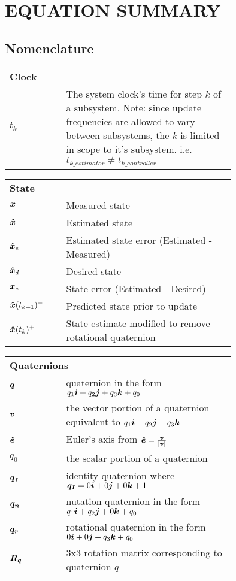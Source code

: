\chapter{EQUATION SUMMARY}
\label{chap:EquationSummary}

\section{Nomenclature}

\begin{nomenclature}
\begin{tabular}{lp{0.75\linewidth}}
  \multicolumn{2}{l}{\textbf{Clock}} \\
  $t_k$ & The system clock's time for step $k$ of a subsystem.  Note: since update frequencies are allowed to vary between subsystems, the $k$ is limited in scope to it's subsystem.  i.e. $t_{k\_estimator} \ne t_{k\_controller}$ \\
\end{tabular}

\begin{tabular}{lp{0.75\linewidth}}
  \multicolumn{2}{l}{\textbf{State}} \\
  $\boldsymbol{x}$ & Measured state \\
  $\boldsymbol{\hat{x}}$ & Estimated state \\
  $\boldsymbol{\hat{x}}_e$ & Estimated state error (Estimated - Measured)\\
  $\boldsymbol{\hat{x}}_d$ & Desired state \\
  $\boldsymbol{x}_e$ & State error (Estimated - Desired) \\
  $\boldsymbol{\hat{x}}(t_{k+1})^-$ & Predicted state prior to update \\
  $\boldsymbol{\hat{x}}(t_k)^+$ & State estimate modified to remove rotational quaternion \\
\end{tabular}

\begin{tabular}{lp{0.75\linewidth}}
  \multicolumn{2}{l}{\textbf{Quaternions}} \\
  $\boldsymbol{q}$ & quaternion in the form $q_1\boldsymbol{i}+q_2\boldsymbol{j}+q_3\boldsymbol{k}+q_0$ \\
  $\boldsymbol{v}$ & the vector portion of a quaternion equivalent to $q_1\boldsymbol{i}+q_2\boldsymbol{j}+q_3\boldsymbol{k}$ \\
  $\boldsymbol{\hat{e}}$ & Euler's axis from $\boldsymbol{\hat{e}} = \frac{\boldsymbol{v}}{|\boldsymbol{v}|}$ \\
  $q_0$ & the scalar portion of a quaternion \\
  $\boldsymbol{q}_I$ & identity quaternion where $\boldsymbol{q_I} = 0\boldsymbol{i}+0\boldsymbol{j}+0\boldsymbol{k}+1$ \\
  $\boldsymbol{q_n}$ & nutation quaternion in the form $ q_1 \boldsymbol{i} + q_2 \boldsymbol{j} + 0 \boldsymbol{k} + q_0 $ \\
  $\boldsymbol{q_r}$ & rotational quaternion in the form $ 0 \boldsymbol{i} + 0 \boldsymbol{j} + q_3 \boldsymbol{k} + q_0 $ \\
  $\boldsymbol{R_q}$ & 3x3 rotation matrix corresponding to quaternion $q$ \\
\end{tabular}


\end{nomenclature}
